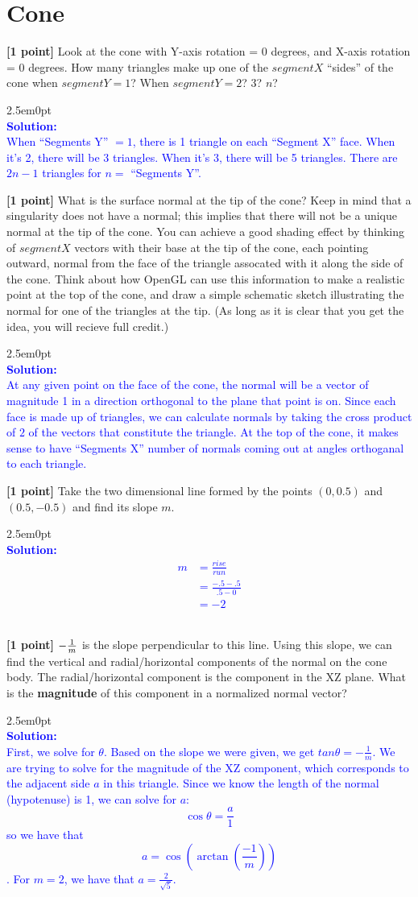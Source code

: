 \documentclass[10pt,twocolumn]{article}
\newcommand{\solution}[1]{\begin{adjustwidth}{2.5em}{0pt}\textcolor{Blue}{\\{\bf Solution:} \\ #1}\\[5mm] \end{adjustwidth}}  %
\begin{document}
\section{Cone}
{\bf [1 point]} Look at the cone with Y-axis rotation = 0 degrees, and X-axis rotation = 0 degrees. How many triangles make up one of the $segmentX$ ``sides'' of the cone when $segmentY=1$? When $segmentY=2$? 3? $n$?
\solution{
When ``Segments Y'' $= 1$, there is 1 triangle on each ``Segment X'' face. When it's 2, there will be 3 triangles. When it's 3, there will be 5 triangles. There are $2n - 1$ triangles for $n =$ ``Segments Y''.
}
{\bf [1 point]} What is the surface normal at the tip of the cone? Keep in mind that a singularity does not have a normal; this implies that there will not be a unique normal at the tip of the cone. You can achieve a good shading effect by thinking of $segmentX$ vectors with their base at the tip of the cone, each pointing outward, normal from the face of the triangle assocated with it along the side of the cone. Think about how OpenGL can use this information to make a realistic point at the top of the cone, and draw a simple schematic sketch illustrating the normal for one of the triangles at the tip. (As long as it is clear that you get the idea, you will recieve full credit.)
\solution{
At any given point on the face of the cone, the normal will be a vector of magnitude 1 in a direction orthogonal to the plane that point is on. Since each face is made up of triangles, we can calculate normals by taking the cross product of $2$ of the vectors that constitute the triangle. At the top of the cone, it makes sense to have ``Segments X'' number of normals coming out at angles orthoganal to each triangle. 
}
{\bf [1 point]} Take the two dimensional line formed by the points $(0, 0.5)$ and $(0.5, -0.5)$ and find its slope $m$.
\solution{
\begin{align*}
m &= \frac{rise}{run} \\
&= \frac{-.5 - .5}{.5 - 0} \\
&= -2
\end{align*}
}
{\bf [1 point]} $-{{1}\over{m}}$ is the slope perpendicular to this line. Using this slope, we
can find the vertical and radial/horizontal components of the normal on the cone body. The radial/horizontal component is the component in the XZ plane. What is the {\bf magnitude} of this component in a normalized normal vector?
\solution{
First, we solve for $\theta$. Based on the slope we were given, we get $tan \theta = - \frac{1}{m}$. We are trying to solve for the magnitude of the XZ component, which corresponds to the adjacent side $a$ in this triangle. Since we know the length of the normal (hypotenuse) is 1, we can solve for $a$: \[\cos{\theta} = \frac{a}{1} \] so we have that \[a = \cos{\left(\arctan{\left(\frac{-1}{m} \right)}\right)} \]. For $m = 2$, we have that $a = \frac{2}{\sqrt{5}}$.
}
\end{document}
